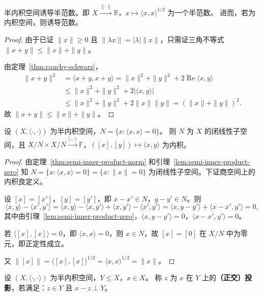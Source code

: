 \documentclass[lang=cn,a4paper,newtx,section]{elegantbook}
\begin{document}
\begin{theorem}[半内积诱导范数]\label{thm:semi-inner-product-norm}
  半内积空间诱导半范数。即 $X\xrightarrow{\|\cdot\|}\mathbb{R}$，$x\mapsto\langle x,x\rangle^{1/2}$ 为一个半范数。
  进而，若为内积空间，则诱导范数。
\end{theorem}

\begin{proof}
  由于已证 $\|x\|\ge 0$ 且 $\|\lambda x\|=|\lambda|\|x\|$，只需证三角不等式 $\|x+y\|\le\|x\|+\|y\|$。

  由定理~\ref{thm:cauchy-schwarz}，
  \begin{align*}
    \|x+y\|^2 &= \langle x+y,x+y\rangle = \|x\|^2+\|y\|^2+2\operatorname{Re}\langle x,y\rangle \\
    &\le \|x\|^2+\|y\|^2+2|\langle x,y\rangle| \\
    &\le \|x\|^2+\|y\|^2+2\|x\|\|y\| = (\|x\|+\|y\|)^2.
  \end{align*}
  故 $\|x+y\|\le\|x\|+\|y\|$。
\end{proof}

\begin{theorem}[商空间内积结构]\label{thm:quotient-inner-product}
  设 $(X,\langle\cdot,\cdot\rangle)$ 为半内积空间，$N=\{x:\langle x,x\rangle=0\}$。
  则 $N$ 为 $X$ 的闭线性子空间，且 $X/N\times X/N\xrightarrow{\langle\cdot,\cdot\rangle}\mathbb{F}$，$([x],[y])\mapsto\langle x,y\rangle$ 为内积。
\end{theorem}

\begin{proof}
  由定理~\ref{thm:semi-inner-product-norm} 和引理~\ref{lem:semi-inner-product-zero} 知 $N=\{x:\langle x,x\rangle=0\}=\{x:\|x\|=0\}$ 为闭线性子空间。下证商空间上的内积良定义。

  设 $[x]=[x']$，$[y]=[y']$，即 $x-x'\in N$，$y-y'\in N$。则
  \[
    \langle x,y\rangle-\langle x',y'\rangle = \langle x,y\rangle-\langle x,y'\rangle+\langle x,y'\rangle-\langle x',y'\rangle = \langle x,y-y'\rangle+\langle x-x',y'\rangle = 0,
  \]
  其中由引理~\ref{lem:semi-inner-product-zero}，$\langle x,y-y'\rangle=0$，$\langle x-x',y'\rangle=0$。

  若 $\langle[x],[x]\rangle=0$，即 $\langle x,x\rangle=0$，则 $x\in N$，故 $[x]=[0]$ 在 $X/N$ 中为零元，即正定性成立。

  又 $\|[x]\|=\langle[x],[x]\rangle^{1/2}=\langle x,x\rangle^{1/2}=\|x\|$。
\end{proof}

\begin{definition}[正交投影到子空间]
  设 $(X,\langle\cdot,\cdot\rangle)$ 为半内积空间，$Y\le X$，$x\in X$。
  称 $z$ 为 $x$ 在 $Y$ 上的\textbf{（正交）投影}，若满足：$z\in Y$ 且 $x-z\perp Y$。
\end{definition}
\end{document}

